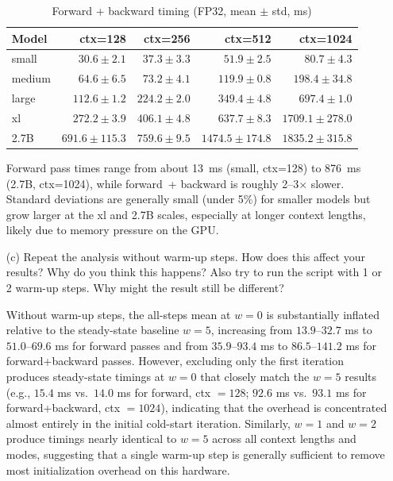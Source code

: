 \documentclass[letterpaper]{article}
\begin{document}
\begin{itemize}
		\begin{table}[H]
			\centering
			\caption{Forward + backward timing (FP32, mean $\pm$ std, ms)}
			\label{tab:fwdbwd-timing}
			\begin{tabular}{lrrrr}
				\hline
				Model & ctx=128 & ctx=256 & ctx=512 & ctx=1024 \\
				\hline
				small  & $30.6 \pm 2.1$   & $37.3 \pm 3.3$  & $51.9 \pm 2.5$   & $80.7 \pm 4.3$ \\
				medium & $64.6 \pm 6.5$   & $73.2 \pm 4.1$  & $119.9 \pm 0.8$  & $198.4 \pm 34.8$ \\
				large  & $112.6 \pm 1.2$  & $224.2 \pm 2.0$ & $349.4 \pm 4.8$  & $697.4 \pm 1.0$ \\
				xl     & $272.2 \pm 3.9$  & $406.1 \pm 4.8$ & $637.7 \pm 8.3$  & $1709.1 \pm 278.0$ \\
				2.7B   & $691.6 \pm 115.3$ & $759.6 \pm 9.5$ & $1474.5 \pm 174.8$ & $1835.2 \pm 315.8$ \\
				\hline
			\end{tabular}
		\end{table}
		
		Forward pass times range from about 13~ms (small, ctx=128) to 876~ms (2.7B, ctx=1024), while forward~+ backward is roughly 2--3$\times$ slower. Standard deviations are generally small (under 5\%) for smaller models but grow larger at the xl and 2.7B scales, especially at longer context lengths, likely due to memory pressure on the GPU.
		
		\item[(c)] Repeat the analysis without warm-up steps. How does this affect your results? Why do you think this happens? Also try to run the script with 1 or 2 warm-up steps. Why might the result still be different?
		
		Without warm-up steps, the all-steps mean at \(w{=}0\) is substantially inflated relative to the steady-state baseline \(w{=}5\), increasing from \(13.9\text{--}32.7\) ms to \(51.0\text{--}69.6\) ms for forward passes and from \(35.9\text{--}93.4\) ms to \(86.5\text{--}141.2\) ms for forward+backward passes. However, excluding only the first iteration produces steady-state timings at \(w{=}0\) that closely match the \(w{=}5\) results (e.g., \(15.4\) ms vs.\ \(14.0\) ms for forward, ctx \(=128\); \(92.6\) ms vs.\ \(93.1\) ms for forward+backward, ctx \(=1024\)), indicating that the overhead is concentrated almost entirely in the initial cold-start iteration. Similarly, \(w{=}1\) and \(w{=}2\) produce timings nearly identical to \(w{=}5\) across all context lengths and modes, suggesting that a single warm-up step is generally sufficient to remove most initialization overhead on this hardware.
		

\end{itemize}
\end{document}
